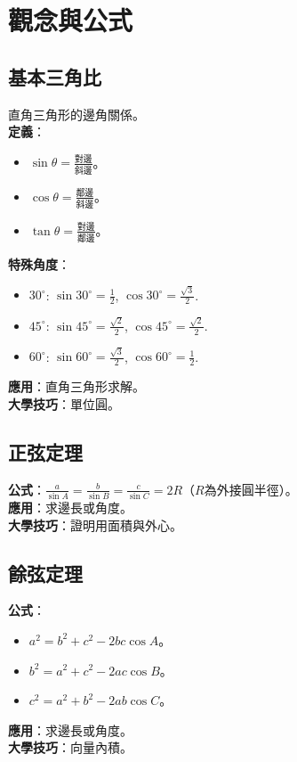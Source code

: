 \section{觀念與公式}

\subsection{基本三角比}
直角三角形的邊角關係。\\
\textbf{定義}：
\begin{itemize}
    \item $\sin \theta = \frac{\text{對邊}}{\text{斜邊}}$。
    \item $\cos \theta = \frac{\text{鄰邊}}{\text{斜邊}}$。
    \item $\tan \theta = \frac{\text{對邊}}{\text{鄰邊}}$。
\end{itemize}
\textbf{特殊角度}：
\begin{itemize}
    \item $30^\circ$: $\sin 30^\circ = \frac{1}{2}$, $\cos 30^\circ = \frac{\sqrt{3}}{2}$.
    \item $45^\circ$: $\sin 45^\circ = \frac{\sqrt{2}}{2}$, $\cos 45^\circ = \frac{\sqrt{2}}{2}$.
    \item $60^\circ$: $\sin 60^\circ = \frac{\sqrt{3}}{2}$, $\cos 60^\circ = \frac{1}{2}$.
\end{itemize}
\textbf{應用}：直角三角形求解。\\
\textbf{大學技巧}：單位圓。

\subsection{正弦定理}
\textbf{公式}：$\frac{a}{\sin A} = \frac{b}{\sin B} = \frac{c}{\sin C} = 2R$（$R$為外接圓半徑）。\\
\textbf{應用}：求邊長或角度。\\
\textbf{大學技巧}：證明用面積與外心。

\subsection{餘弦定理}
\textbf{公式}：
\begin{itemize}
    \item $a^2 = b^2 + c^2 - 2bc \cos A$。
    \item $b^2 = a^2 + c^2 - 2ac \cos B$。
    \item $c^2 = a^2 + b^2 - 2ab \cos C$。
\end{itemize}
\textbf{應用}：求邊長或角度。\\
\textbf{大學技巧}：向量內積。

